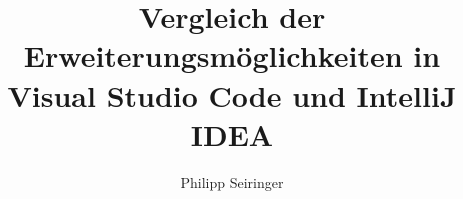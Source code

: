 \documentclass[bachelor,german,smartquotes]{hgbthesis}
\begin{document}


\title{Vergleich der Erweiterungsmöglichkeiten in Visual Studio Code und IntelliJ IDEA}
\author{Philipp Seiringer}





\frontmatter                                       %

\maketitle

		
	

\tableofcontents		

\mainmatter                             %










\appendix                                                               %


\backmatter                          %

\MakeBibliography %


%

\end{document}
